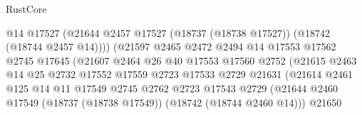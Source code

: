 \begin{lexlean}{RustCore}
\begin{coremodule}
                                        @14
                                        @17527
                                        (@21644
                                          @2457
                                          @17527
                                          (@18737 (@18738 @17527))
                                          (@18742 (@18744 @2457 @14))))
                                      (@21597
                                        @2465
                                        @2472
                                        @2494
                                        @14
                                        @17553
                                        @17562
                                        @2745
                                        @17645
                                        (@21607
                                          @2464
                                          @26
                                          @40
                                          @17553
                                          @17560
                                          @2752
                                          (@21615
                                            @2463
                                            @14
                                            @25
                                            @2732
                                            @17552
                                            @17559
                                            @2723
                                            @17533
                                            @2729
                                            @21631
                                            (@21614
                                              @2461
                                              @125
                                              @14
                                              @11
                                              @17549
                                              @2745
                                              @2762
                                              @2723
                                              @17543
                                              @2729
                                              (@21644
                                                @2460
                                                @17549
                                                (@18737 (@18738 @17549))
                                                (@18742 (@18744 @2460 @14)))
                                              @21650

\end{coremodule}
\end{lexlean}
